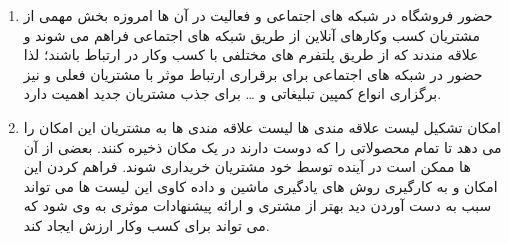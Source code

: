 \documentclass[14pt]{article}
\begin{document}
\begin{flushright}
\begin{enumerate}
\item حضور فروشگاه در شبکه های اجتماعی و فعالیت در آن ها
\newline
امروزه بخش مهمی از مشتریان کسب وکارهای آنلاین از طریق شبکه های اجتماعی فراهم می شوند و علاقه مندند که از طریق پلتفرم های مختلفی با کسب وکار در ارتباط باشند؛‌ لذا حضور در شبکه های اجتماعی برای برقراری ارتباط موثر با مشتریان فعلی و نیز برگزاری انواع کمپین تبلیغاتی و … برای جذب مشتریان جدید اهمیت دارد.
\item امکان تشکیل لیست علاقه مندی ها 
\newline
لیست علاقه مندی ها به مشتریان این امکان را می دهد تا تمام محصولاتی را که دوست دارند در یک مکان ذخیره کنند. بعضی از آن ها ممکن است در آینده توسط خود مشتریان خریداری شوند. فراهم کردن این امکان و به کارگیری روش های یادگیری ماشین و داده کاوی این لیست ها می تواند سبب به دست آوردن دید بهتر از مشتری و ارائه پیشنهادات موثری به وی شود که می تواند برای کسب وکار ارزش ایجاد کند.


\end{enumerate}
\end{flushright}
\end{document}
